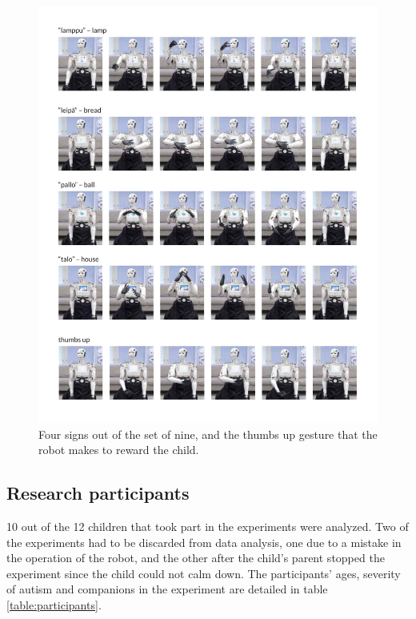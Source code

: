 \begin{figure}
\centering
  \includegraphics[width=\linewidth]{images/viittomat2.pdf}
  \caption{Four signs out of the set of nine, and the thumbs up gesture that the robot makes to reward the child.}
  \label{fig:viittomat2}
\end{figure}


\subsection{Research participants}

10 out of the 12 children that took part in the experiments were analyzed. Two of the experiments had to be discarded from data analysis, one due to a mistake in the operation of the robot, and the other after the child's parent stopped the experiment since the child could not calm down. The participants' ages, severity of autism and companions in the experiment are detailed in table \ref{table:participants}.


